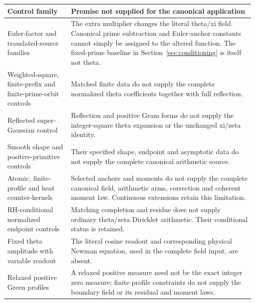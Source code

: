 \begin{center}\small
\begin{tabularx}{\textwidth}{@{}>{\raggedright\arraybackslash}p{}Y@{}}
\toprule
Control family & Premise not supplied for the canonical application\\
\midrule
Euler-factor and translated-source families &
The extra multiplier changes the literal theta/xi field. Canonical
prime subtraction and Euler-anchor constants cannot simply be assigned
to the altered function. The fixed-prime baseline in
Section~\ref{sec:conditioning} is itself not theta.\\
Weighted-square, finite-prefix and finite-prime-orbit controls &
Matched finite data do not supply the complete normalized theta
coefficients together with full reflection.\\
Reflected super-Gaussian control &
Reflection and positive Gram forms do not supply the integer-square
theta expansion or the unchanged xi/zeta identity.\\
Smooth shape and positive-primitive controls &
Their specified shape, endpoint and asymptotic data do not supply the
complete canonical arithmetic source.\\
Atomic, finite-profile and heat counter-kernels &
Selected anchors and moments do not supply the complete canonical
field, arithmetic arms, correction and coherent moment law. Continuous
extensions retain this limitation.\\
RH-conditional normalized endpoint controls &
Matching completion and residue does not supply ordinary theta/zeta
Dirichlet arithmetic. Their conditional status is retained.\\
Fixed theta amplitude with variable readout &
The literal cosine readout and corresponding physical Newman equation,
used in the complete field input, are absent.\\
Relaxed positive Green profiles &
A relaxed positive measure need not be the exact integer zero measure;
finite profile constraints do not supply the boundary field or its
residual and moment laws.\\
\bottomrule
\end{tabularx}
\end{center}


